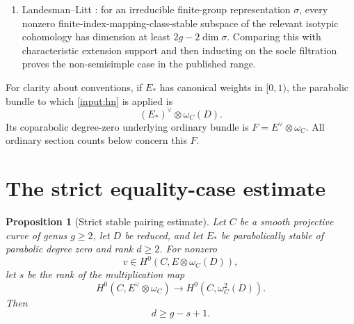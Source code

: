 \documentclass[11pt]{article}
\newtheorem{proposition}[theorem]{Proposition}
\theoremstyle{definition}
\begin{document}
\begin{enumerate}[label=\textup{(I\arabic*)},leftmargin=2.9em]
\item\label{input:socle}
Landesman--Litt \cite[Theorem~7.2.1, Lemma~8.6.1, and
Section~8.7]{LLCan}: for an irreducible finite-group representation
$\sigma$, every nonzero finite-index-mapping-class-stable subspace of the
relevant isotypic cohomology has dimension at least
$2g-2\dim\sigma$.  Comparing this with characteristic extension support and
then inducting on the socle filtration proves the non-semisimple case in
the published range.
\end{enumerate}

For clarity about conventions, if $E_*$ has canonical weights in $[0,1)$,
the parabolic bundle to which \cref{input:hn} is applied is
\[
 (E_*)^\vee\otimes\omega_C(D).
\]
Its coparabolic degree-zero underlying ordinary bundle is
$F=E^\vee\otimes\omega_C$.  All ordinary section counts below concern this
$F$.

\section{The strict equality-case estimate}\label{sec:endpoint}

\begin{proposition}[Strict stable pairing estimate]
\label{prop:endpoint-pairing}
Let $C$ be a smooth projective curve of genus $g\ge2$, let $D$ be reduced,
and let $E_*$ be parabolically stable of parabolic degree zero and rank
$d\ge2$.  For nonzero
\[
 v\in H^0(C,E\otimes\omega_C(D)),
\]
let $s$ be the rank of the multiplication map
\[
 H^0(C,E^\vee\otimes\omega_C)
 \longrightarrow H^0(C,\omega_C^2(D)).
\]
Then
\[
 \boxed{d\ge g-s+1.}
\]
\end{proposition}
\end{document}
